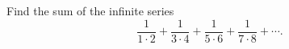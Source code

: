 Find the sum of the infinite series
\[
\dfrac{1}{1\cdot2}+\dfrac{1}{3\cdot4}+\dfrac{1}{5\cdot6}+\dfrac{1}{7\cdot8}+\cdots .
\]
